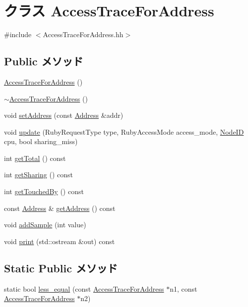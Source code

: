 \hypertarget{classAccessTraceForAddress}{
\section{クラス AccessTraceForAddress}
\label{classAccessTraceForAddress}
}


{\ttfamily \#include $<$AccessTraceForAddress.hh$>$}\subsection*{Public メソッド}
\begin{DoxyCompactItemize}
\item 
\hyperlink{classAccessTraceForAddress_a39e3c32f62a22b90aae6b635958cd33b}{AccessTraceForAddress} ()
\item 
\hyperlink{classAccessTraceForAddress_aaa716e2119d8eda1e7428c63cedd2d75}{$\sim$AccessTraceForAddress} ()
\item 
void \hyperlink{classAccessTraceForAddress_a53120b1754f27e405338f9ab6e3408cc}{setAddress} (const \hyperlink{classAddress}{Address} \&addr)
\item 
void \hyperlink{classAccessTraceForAddress_a6ef5b8f5316bc299293f80e66d246a34}{update} (RubyRequestType type, RubyAccessMode access\_\-mode, \hyperlink{TypeDefines_8hh_a83c14b4ae37e80071f6b3506a6c46151}{NodeID} cpu, bool sharing\_\-miss)
\item 
int \hyperlink{classAccessTraceForAddress_af262952019c2e5f874224855cf7fb8bd}{getTotal} () const 
\item 
int \hyperlink{classAccessTraceForAddress_a7cf842218272765ebb03269975968026}{getSharing} () const 
\item 
int \hyperlink{classAccessTraceForAddress_a85c70aea5e7b3ab23bd505f66e16cbef}{getTouchedBy} () const 
\item 
const \hyperlink{classAddress}{Address} \& \hyperlink{classAccessTraceForAddress_aca15ef966561def0b4db75a6f7e085b6}{getAddress} () const 
\item 
void \hyperlink{classAccessTraceForAddress_ae8690c0646a12dd970f77127705f1449}{addSample} (int value)
\item 
void \hyperlink{classAccessTraceForAddress_ac55fe386a101fbae38c716067c9966a0}{print} (std::ostream \&out) const 
\end{DoxyCompactItemize}
\subsection*{Static Public メソッド}
\begin{DoxyCompactItemize}
\item 
static bool \hyperlink{classAccessTraceForAddress_af4b2dcff6f65bd1bcbcc0cd9995d0d35}{less\_\-equal} (const \hyperlink{classAccessTraceForAddress}{AccessTraceForAddress} $\ast$n1, const \hyperlink{classAccessTraceForAddress}{AccessTraceForAddress} $\ast$n2)
\end{DoxyCompactItemize}
